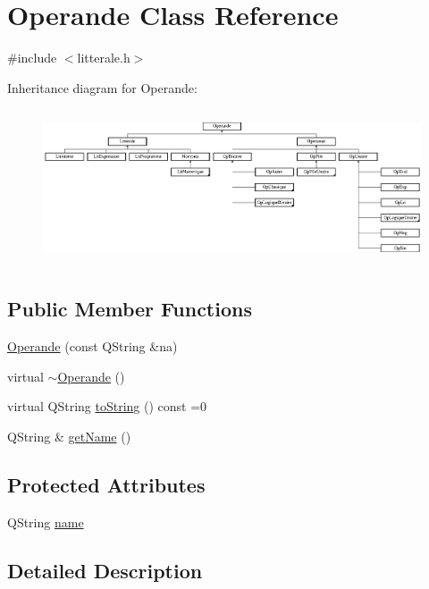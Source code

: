 \hypertarget{class_operande}{}\section{Operande Class Reference}
\label{class_operande}


{\ttfamily \#include $<$litterale.\+h$>$}

Inheritance diagram for Operande\+:\begin{figure}[H]
\begin{center}
\leavevmode
\includegraphics[height=4.628099cm]{class_operande}
\end{center}
\end{figure}
\subsection*{Public Member Functions}
\begin{DoxyCompactItemize}
\item 
\hyperlink{class_operande_acd4af503ef581f5d74f8a2db19fc0e1a}{Operande} (const Q\+String \&na)
\item 
virtual \hyperlink{class_operande_a36c291e8856c7ebcf8278ac5a14575a4}{$\sim$\+Operande} ()
\item 
virtual Q\+String \hyperlink{class_operande_a2acae8f59199e93850b3fdb13eba1672}{to\+String} () const  =0
\item 
Q\+String \& \hyperlink{class_operande_a0b5205c009a81e48a66544bfe819ce30}{get\+Name} ()
\end{DoxyCompactItemize}
\subsection*{Protected Attributes}
\begin{DoxyCompactItemize}
\item 
Q\+String \hyperlink{class_operande_abb638f60898b542d803a146a297706e0}{name}
\end{DoxyCompactItemize}


\subsection{Detailed Description}


